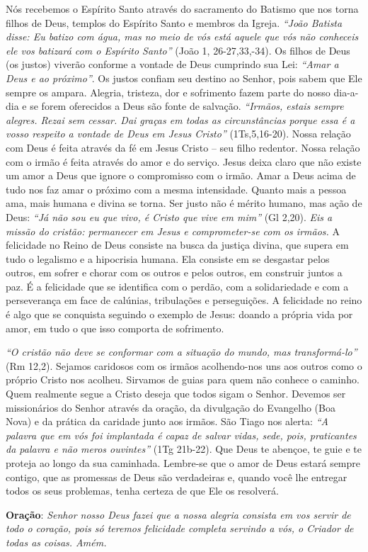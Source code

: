 \documentclass[
]{book}
\begin{document}
Nós recebemos o Espírito Santo através do sacramento do Batismo que nos torna filhos de Deus, templos do Espírito Santo e membros da Igreja. \emph{``João Batista disse: Eu batizo com água, mas no meio de vós está aquele que vós não conheceis ele vos batizará com o Espírito Santo''} (João 1, 26-27,33,-34). Os filhos de Deus (os justos) viverão conforme a vontade de Deus cumprindo sua Lei: \emph{``Amar a Deus e ao próximo''}. Os justos confiam seu destino ao Senhor, pois sabem que Ele sempre os ampara. Alegria, tristeza, dor e sofrimento fazem parte do nosso dia-a-dia e se forem oferecidos a Deus são fonte de salvação. \emph{``Irmãos, estais sempre alegres. Rezai sem cessar. Dai graças em todas as circunstâncias porque essa é a vosso respeito a vontade de Deus em Jesus Cristo''} (1Ts,5,16-20). Nossa relação com Deus é feita através da fé em Jesus Cristo -- seu filho redentor. Nossa relação com o irmão é feita através do amor e do serviço. Jesus deixa claro que não existe um amor a Deus que ignore o compromisso com o irmão. Amar a Deus acima de tudo nos faz amar o próximo com a mesma intensidade. Quanto mais a pessoa ama, mais humana e divina se torna. Ser justo não é mérito humano, mas ação de Deus: \emph{``Já não sou eu que vivo, é Cristo que vive em mim''} (Gl 2,20). \emph{Eis a missão do cristão: permanecer em Jesus e comprometer-se com os irmãos.} A felicidade no Reino de Deus consiste na busca da justiça divina, que supera em tudo o legalismo e a hipocrisia humana. Ela consiste em se desgastar pelos outros, em sofrer e chorar com os outros e pelos outros, em construir juntos a paz. É a felicidade que se identifica com o perdão, com a solidariedade e com a perseverança em face de calúnias, tribulações e perseguições. A felicidade no reino é algo que se conquista seguindo o exemplo de Jesus: doando a própria vida por amor, em tudo o que isso comporta de sofrimento.

\emph{``O cristão não deve se conformar com a situação do mundo, mas transformá-lo''} (Rm 12,2). Sejamos caridosos com os irmãos acolhendo-nos uns aos outros como o próprio Cristo nos acolheu. Sirvamos de guias para quem não conhece o caminho. Quem realmente segue a Cristo deseja que todos sigam o Senhor. Devemos ser missionários do Senhor através da oração, da divulgação do Evangelho (Boa Nova) e da prática da caridade junto aos irmãos. São Tiago nos alerta: \emph{``A palavra que em vós foi implantada é capaz de salvar vidas, sede, pois, praticantes da palavra e não meros ouvintes''} (1Tg 21b-22). Que Deus te abençoe, te guie e te proteja ao longo da sua caminhada. Lembre-se que o amor de Deus estará sempre contigo, que as promessas de Deus são verdadeiras e, quando você lhe entregar todos os seus problemas, tenha certeza de que Ele os resolverá.

\textbf{Oração}:
\emph{Senhor nosso Deus fazei que a nossa alegria consista em vos servir de todo o coração, pois só teremos felicidade completa servindo a vós, o Criador de todas as coisas. Amém.}

  
\end{document}
